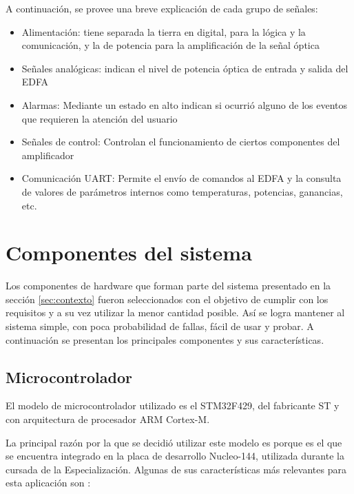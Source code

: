 A continuación, se provee una breve explicación de cada grupo de señales:
\begin{itemize}
\item Alimentación: tiene separada la tierra en digital, para la lógica y la comunicación, y la de potencia para la amplificación de la señal óptica
\item Señales analógicas: indican el nivel de potencia óptica de entrada y salida del EDFA
\item Alarmas: Mediante un estado en alto indican si ocurrió alguno de los eventos que requieren la atención del usuario
\item Señales de control: Controlan el funcionamiento de ciertos componentes del amplificador
\item Comunicación UART: Permite el envío de comandos al EDFA y la consulta de valores de parámetros internos como temperaturas, potencias, ganancias, etc.
\end{itemize}

\section{Componentes del sistema}

Los componentes de hardware que forman parte del sistema presentado en la sección \ref{sec:contexto} fueron seleccionados con el objetivo de cumplir con los requisitos y a su vez utilizar la menor cantidad posible. Así se logra mantener al sistema simple, con poca probabilidad de fallas, fácil de usar y probar. A continuación se presentan los principales componentes y sus características.

\subsection{Microcontrolador}

El modelo de microcontrolador utilizado es el STM32F429, del fabricante ST y con arquitectura de procesador ARM Cortex-M.

La principal razón por la que se decidió utilizar este modelo es porque es el que se encuentra integrado en la placa de desarrollo Nucleo-144, utilizada durante la cursada de la Especialización. Algunas de sus características más relevantes para esta aplicación son \citep{STM32F429}:

